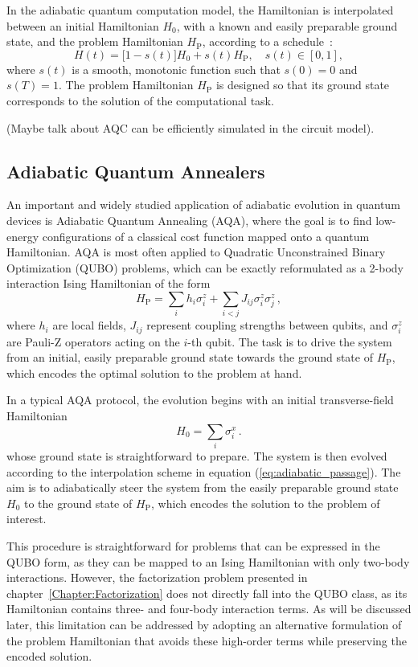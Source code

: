 In the adiabatic quantum computation model, the Hamiltonian is interpolated between an
initial Hamiltonian $H_0$, with a known and easily preparable ground state, and the problem
Hamiltonian $H_\mathrm{P}$, according to a schedule~\cite{albash_adiabatic_2018}:
\begin{equation}
    H(t) = \big[1 - s(t)\big] H_0 + s(t) H_\mathrm{P}, \quad s(t) \in [0,1],
    \label{eq:adiabatic_passage}
\end{equation}
where $s(t)$ is a smooth, monotonic function such that $s(0)=0$ and $s(T)=1$. The problem
Hamiltonian $H_\mathrm{P}$ is designed so that its ground state corresponds to the solution
of the computational task.

{\color{red}(Maybe talk about AQC can be efficiently simulated in the circuit model).}

\subsection{Adiabatic Quantum Annealers}
An important and widely studied application of adiabatic evolution in quantum
devices is Adiabatic Quantum Annealing (AQA), where the goal is to find low-energy configurations of
a classical cost function mapped onto a quantum Hamiltonian. AQA is most often applied to Quadratic Unconstrained
Binary Optimization (QUBO) problems, which can be exactly reformulated as a 2-body interaction Ising
Hamiltonian of the form
\begin{equation}
    H_\mathrm{P} = \sum_i h_i \sigma_i^z + \sum_{i<j} J_{ij} \sigma_i^z \sigma_j^z\,,
    \label{eq:ising_hamiltonian}
\end{equation}
where $h_i$ are local fields, $J_{ij}$ represent coupling strengths between qubits, and
$\sigma_i^z$ are Pauli-Z operators acting on the $i$-th qubit. The task is to drive the system
from an initial, easily preparable ground state towards the ground state of $H_\mathrm{P}$,
which encodes the optimal solution to the problem at hand.

In a typical AQA protocol, the evolution begins with an initial transverse-field Hamiltonian
\begin{equation}
    H_0 = \sum_i \sigma_i^x\,.
    \label{eq:transverse_field_hamiltonian}
\end{equation}
whose ground state is straightforward to prepare. The system is then evolved according to the interpolation
scheme in equation (\ref{eq:adiabatic_passage}). The aim is to adiabatically steer the system from the easily
preparable ground state $H_0$ to the ground state of $H_\mathrm{P}$, which encodes the solution to the
problem of interest.

This procedure is straightforward for problems that can be expressed in the QUBO form, as they can be mapped to
an Ising Hamiltonian with only two-body interactions. However, the factorization problem presented in
chapter~\ref{Chapter:Factorization} does not directly fall into the QUBO class, as its Hamiltonian contains
three- and four-body interaction terms. As will be discussed later, this limitation can be addressed by adopting
an alternative formulation of the problem Hamiltonian that avoids these high-order terms while preserving the encoded solution.